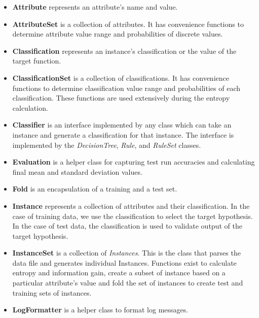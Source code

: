 \documentclass[10pt]{report}
\begin{document}
\begin{itemize}
\item \textbf{Attribute} represents an attribute's name and value.

\item \textbf{AttributeSet} is a collection of attributes. It has
  convenience functions to determine attribute value range and
  probabilities of discrete values.

\item \textbf{Classification} represents an instance's classification
  or the value of the target function.

\item \textbf{ClassificationSet} is a collection of
  classifications. It has convenience functions to determine
  classification value range and probabilities of each
  classification. These functions are used extensively during the
  entropy calculation. 

\item \textbf{Classifier} is an interface implemented by any class
  which can take an instance and generate a classification for that
  instance. The interface is implemented by the \textit{DecisionTree},
  \textit{Rule}, and \textit{RuleSet} classes.

\item \textbf{Evaluation} is a helper class for capturing test run
  accuracies and calculating final mean and standard deviation values.

\item \textbf{Fold} is an encapsulation of a training and a test set.

\item \textbf{Instance} represents a collection of attributes and
  their classification. In the case of training data, we use the
  classification to select the target hypothesis. In the case of test
  data, the classification is used to validate output of the target
  hypothesis.

\item \textbf{InstanceSet} is a collection of \textit{Instances}. This is the
  class that parses the data file and generates individual
  Instances. Functions exist to calculate entropy and information
  gain, create a subset of instance based on a particular attribute's
  value and fold the set of instances to create test and training sets
  of instances.

\item \textbf{LogFormatter} is a helper class to format log messages.


\end{itemize}
\end{document}

